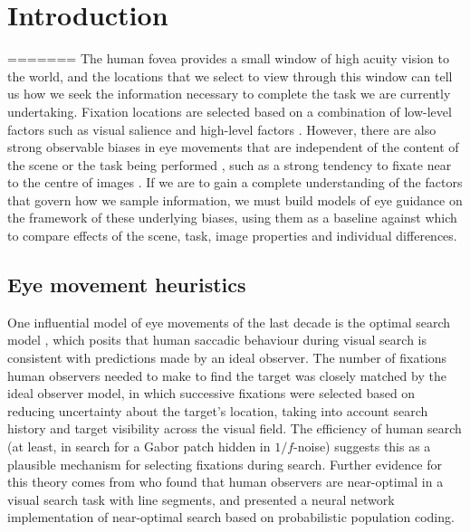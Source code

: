 \section{Introduction}
=======
The human fovea provides a small window of high acuity vision to the world, and the locations that we select to view through this window can tell us how we seek the information necessary to complete the task we are currently undertaking. Fixation locations are selected based on a combination of low-level factors such as visual salience \citep{borji2013} and high-level factors \citep{yarbus1967, buswell1935, land2001}. However, there are also strong observable biases in eye movements that are independent of the content of the scene or the task being performed \citep{tatler-vincent2009, foulsham2010}, such as a strong tendency to fixate near to the centre of images \citep{tatler2007, canosa2003, stainer2013}. If we are to gain a complete understanding of the factors that govern how we sample information, we must build models of eye guidance on the framework of these underlying biases, using them as a baseline against which to compare effects of the scene, task, image properties and individual differences.

\subsection{Eye movement heuristics}

One influential model of eye movements of the last decade is the optimal search model \citep{najemnik-geisler2008}, which posits that human saccadic behaviour during visual search is consistent with predictions made by an ideal observer. The number of fixations human observers needed to make to find the target was closely matched by the ideal observer model, in which successive fixations were selected based on reducing uncertainty about the target's location, taking into account search history and target visibility across the visual field. The efficiency of human search (at least, in search for a Gabor patch hidden in $1/f$-noise) suggests this as a plausible mechanism for selecting fixations during search. Further evidence for this theory comes from \cite{ma2011} who found that human observers are near-optimal in a visual search task with line segments, and presented a neural network implementation of near-optimal search based on probabilistic population coding.  

